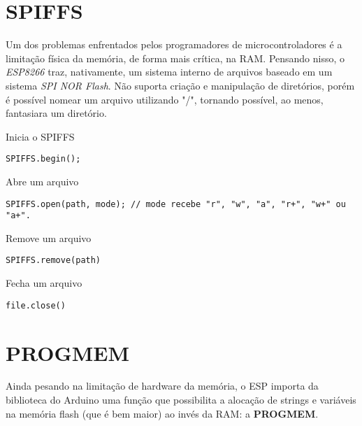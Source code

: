 \documentclass[
	11pt,				%
	openright,			%
	twoside,			%
	a5paper,			%
	english,			%
	french,				%
	spanish,			%
	brazil,				%
	sumario=tradicional
]{abntex2}
\begin{document}
\section{SPIFFS}
Um dos problemas enfrentados pelos programadores de microcontroladores é a limitação física da memória, de forma mais crítica, na RAM. Pensando nisso, o \textit{ESP8266} traz, nativamente, um sistema interno de arquivos baseado em um sistema \textit{SPI NOR Flash}. Não suporta criação e manipulação de diretórios, porém é possível nomear um arquivo utilizando "/", tornando possível, ao menos, fantasiara um diretório.

\vspace{8pt}

\begin{tcolorbox}[colbacktitle=green!50!white!60,
title={\vspace{-13pt}\texttt{[image: notebook.png]} \hspace{2pt} \textsf{\textbf{Na Prática...}\vspace{4pt}}},coltitle=black, colback=white,arc=4mm, outer arc=3.5mm]
\raggedright

Inicia o SPIFFS
\begin{lstlisting}
SPIFFS.begin();
\end{lstlisting}

Abre um arquivo
\begin{lstlisting}
SPIFFS.open(path, mode); // mode recebe "r", "w", "a", "r+", "w+" ou "a+".
\end{lstlisting}

Remove um arquivo
\begin{lstlisting}
SPIFFS.remove(path)
\end{lstlisting}

Fecha um arquivo
\begin{lstlisting}
file.close()
\end{lstlisting}


\end{tcolorbox}

\section{PROGMEM}
Ainda pesando na limitação de hardware da memória, o ESP importa da biblioteca do Arduino uma função que possibilita a alocação de strings e variáveis na memória flash (que é bem maior) ao invés da RAM: a \textbf{\textsf{PROGMEM}}.

\vspace{10pt}
\end{document}
